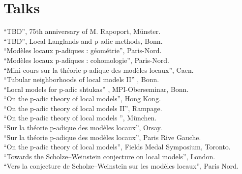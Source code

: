 \documentclass[12pt]{article} %
\begin{document}


\section*{Talks}
``TBD'',  75th anniversary of M. Rapoport, Münster.\\

``TBD'',  Local Langlands and p-adic methods, Bonn.\\

``Modèles locaux p-adiques : géométrie'',  Paris-Nord.\\

``Modèles locaux p-adiques : cohomologie'',  Paris-Nord.\\

``Mini-cours sur la théorie p-adique des modèles locaux'', Caen.
\\

``Tubular neighborhoods of local models II'' , Bonn.\\

``Local models for p-adic shtukas'' , MPI-Oberseminar, Bonn.\\

``On the p-adic  theory of local models'', Hong Kong.
\\

``On the p-adic  theory of local models II'', Rampage.
\\

``On the p-adic  theory of local models '', München.
\\


``Sur la  théorie p-adique des modèles locaux'', Orsay.
\\

``Sur la  théorie p-adique des modèles locaux'', Paris Rive Gauche.
\\

 ``On the p-adic theory of local models'', Fields Medal Symposium, Toronto.
\\

``Towards the Scholze--Weinstein conjecture on local models'', London.
\\

 ``Vers la conjecture de Scholze--Weinstein sur les modèles locaux'', Paris Nord.
\\
\end{document}
